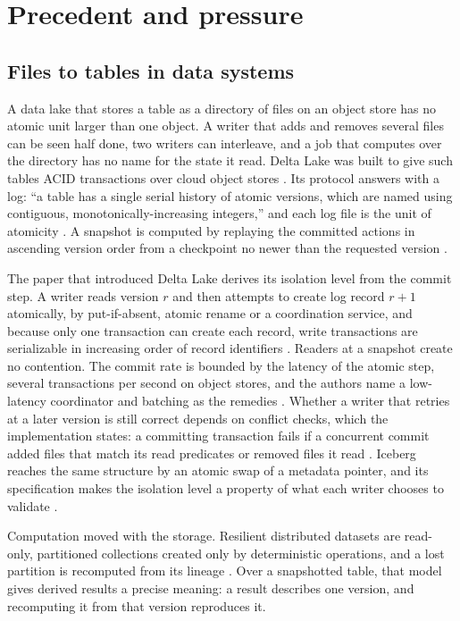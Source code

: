 \documentclass[11pt,letterpaper]{article}
\theoremstyle{definition}
\theoremstyle{remark}
\begin{document}
\section{Precedent and pressure}
\label{sec:syn:precedent}

\subsection{Files to tables in data systems}

A data lake that stores a table as a directory of files on an object store has no atomic unit larger than one object. A writer that adds and removes several files can be seen half done, two writers can interleave, and a job that computes over the directory has no name for the state it read. Delta Lake was built to give such tables ACID transactions over cloud object stores \cite{armbrust2020delta}. Its protocol answers with a log: ``a table has a single serial history of atomic versions, which are named using contiguous, monotonically-increasing integers,'' and each log file is the unit of atomicity \cite{deltaprotocol}. A snapshot is computed by replaying the committed actions in ascending version order from a checkpoint no newer than the requested version \cite{deltaprotocol}.

The paper that introduced Delta Lake derives its isolation level from the commit step. A writer reads version $r$ and then attempts to create log record $r+1$ atomically, by put-if-absent, atomic rename or a coordination service, and because only one transaction can create each record, write transactions are serializable in increasing order of record identifiers \cite{armbrust2020delta}. Readers at a snapshot create no contention. The commit rate is bounded by the latency of the atomic step, several transactions per second on object stores, and the authors name a low-latency coordinator and batching as the remedies \cite{armbrust2020delta}. Whether a writer that retries at a later version is still correct depends on conflict checks, which the implementation states: a committing transaction fails if a concurrent commit added files that match its read predicates or removed files it read \cite{deltaconflictsrc,deltadocscc}. Iceberg reaches the same structure by an atomic swap of a metadata pointer, and its specification makes the isolation level a property of what each writer chooses to validate \cite{icebergspec}.

Computation moved with the storage. Resilient distributed datasets are read-only, partitioned collections created only by deterministic operations, and a lost partition is recomputed from its lineage \cite{zaharia2012rdd}. Over a snapshotted table, that model gives derived results a precise meaning: a result describes one version, and recomputing it from that version reproduces it.
\end{document}
